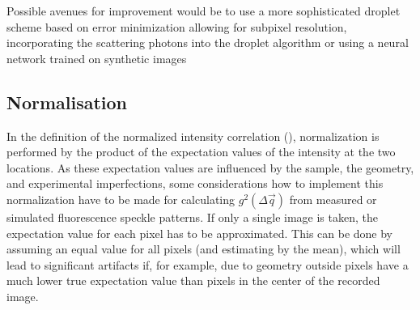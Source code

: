 Possible avenues for improvement would be to use a more sophisticated droplet scheme based on error minimization allowing for subpixel resolution, incorporating the scattering photons into the droplet algorithm or using a neural network trained on synthetic images \cite{baumann2018,collaboration2014,schayck2020}


\subsection{Normalisation}
In the definition of the normalized intensity correlation (), normalization is performed by the product of the expectation values of the intensity at the two locations. As these expectation values are influenced by the sample, the geometry, and experimental imperfections, some considerations how to implement this normalization have to be made for calculating $g^2(\Delta\vec{q})$ from measured or simulated fluorescence speckle patterns. 
If only a single image is taken, the expectation value for each pixel has to be approximated. This can be done by assuming an equal value for all pixels (and estimating by the mean), which will lead to significant artifacts if, for example, due to geometry outside pixels have a much lower true expectation value than pixels in the center of the recorded image.  

